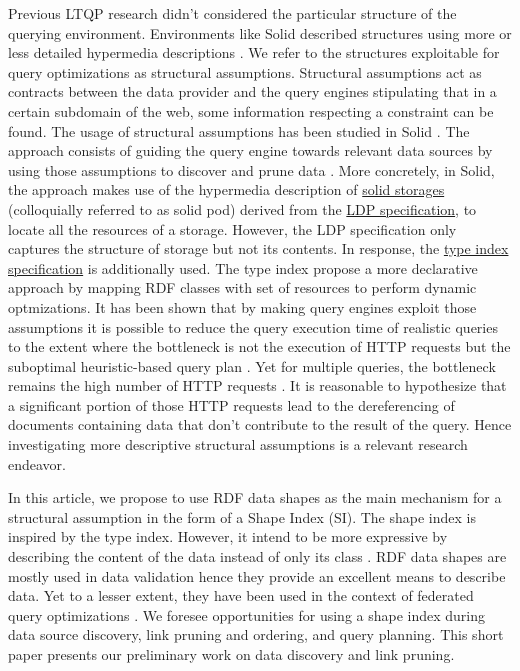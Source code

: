 Previous LTQP research didn't considered the particular structure of the querying environment.
Environments like Solid described structures using more or less detailed hypermedia descriptions \cite{Fielding}.
We refer to the structures exploitable for query optimizations as structural assumptions.
Structural assumptions act as contracts between the data provider and 
the query engines stipulating that in a certain subdomain of the web, some information respecting a constraint can be found.
The usage of structural assumptions has been studied in Solid \cite{Taelman2023}.
The approach consists of guiding the query engine towards relevant data sources by using 
those assumptions to discover and prune data \cite{verborgh2020guided}.
More concretely, in Solid, the approach makes use of the hypermedia description of 
\href{https://solidproject.org/TR/protocol#resources}{solid storages} (colloquially referred to as solid pod)
derived from the \href{https://www.w3.org/TR/ldp/}{LDP specification},
to locate all the resources of a storage.
However, the LDP specification only captures the structure of storage but not its contents.
In response, the \href{https://solid.github.io/type-indexes/}{type index specification} is additionally used.
The type index propose a more declarative approach \cite{Taelman2017} by mapping RDF classes with set of resources to perform dynamic optmizations.
It has been shown that by making query engines exploit those assumptions it is possible to reduce the query execution time
of realistic queries to the extent where the bottleneck is not the execution of 
HTTP requests but the suboptimal heuristic-based query plan \cite{eschauzier_quweda_2023, Taelman2023}.
Yet for multiple queries, the bottleneck remains the high number of HTTP requests  \cite{eschauzier_quweda_2023}.
It is reasonable to hypothesize that a significant portion of those HTTP requests lead to the dereferencing of
documents containing data that don't contribute to the result of the query.
Hence investigating more descriptive structural assumptions is a relevant research endeavor.

In this article, we propose to use RDF data shapes as the main mechanism for a structural assumption in the form of a Shape Index (SI).
The shape index is inspired by the type index.
However, it intend to be more expressive by describing the content of the data instead of only its class \cite{Taelman2017}.
RDF data shapes are mostly used in data validation \cite{Gayo2018a} hence they provide an excellent means to describe data.
Yet to a lesser extent, they have been used in the context of federated query optimizations \cite{kashif2021}.
We foresee opportunities for using a shape index during data source discovery, link pruning and ordering, and query planning.
This short paper presents our preliminary work on data discovery and link pruning.